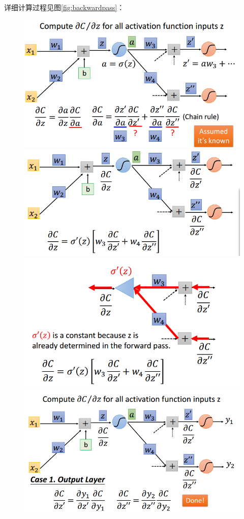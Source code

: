 详细计算过程见图\ref{fig:backwardpass}：
\begin{figure}[htb]
	\centering
	\includegraphics[scale=0.4]{pic/backwardpass_01}
	\includegraphics[scale=0.4]{pic/backwardpass_02}
	\includegraphics[scale=0.4]{pic/backwardpass_03}
	\includegraphics[scale=0.4]{pic/backwardpass_04}

\end{figure}
